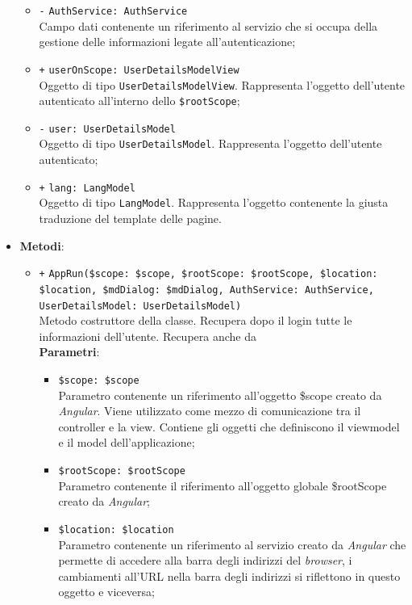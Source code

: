 \begin{itemize}
\begin{itemize}
				\item \texttt{-} \texttt{AuthService: AuthService} \\
				Campo dati contenente un riferimento al servizio che si occupa della gestione delle informazioni legate all'autenticazione;
				\item \texttt{+} \texttt{userOnScope: UserDetailsModelView} \\
				Oggetto di tipo \texttt{UserDetailsModelView}. Rappresenta l'oggetto dell'utente autenticato all'interno dello \texttt{\$rootScope};
				\item \texttt{-} \texttt{user: UserDetailsModel} \\
				Oggetto di tipo \texttt{UserDetailsModel}. Rappresenta l'oggetto dell'utente autenticato;
				\item \texttt{+} \texttt{lang: LangModel} \\
				Oggetto di tipo \texttt{LangModel}. Rappresenta l'oggetto contenente la giusta traduzione del template delle pagine.
			\end{itemize}
			\item \textbf{Metodi}: 
			\begin{itemize}
				\item \texttt{+} \texttt{AppRun(\$scope: \$scope, \$rootScope: \$rootScope, \$location: \$location, \$mdDialog: \$mdDialog, AuthService: AuthService, UserDetailsModel: UserDetailsModel)} \\
				Metodo costruttore della classe. Recupera dopo il login tutte le informazioni dell'utente. Recupera anche da  \\
				\textbf{Parametri}:
				\begin{itemize}
					\item \texttt{\$scope: \$scope} \\
					Parametro contenente un riferimento all’oggetto \$scope creato da \textit{Angular}. Viene utilizzato come mezzo di comunicazione tra il controller e la view. Contiene gli oggetti che definiscono il viewmodel e il model dell’applicazione;
					\item \texttt{\$rootScope: \$rootScope} \\
					Parametro contenente il riferimento all'oggetto globale \$rootScope creato da \textit{Angular};
					\item \texttt{\$location: \$location} \\
					Parametro contenente un riferimento al servizio creato da \textit{Angular} che permette di accedere alla barra degli indirizzi del \textit{browser}, i cambiamenti all’URL nella barra degli indirizzi si riflettono in questo oggetto e viceversa;

\end{itemize}
\end{itemize}
\end{itemize}

